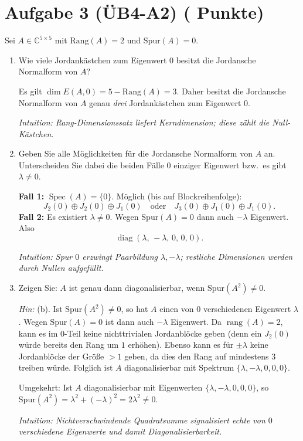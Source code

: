 \documentclass[11pt, a4paper]{article}
\newcommand{\aufgabe}[2]{%
  \section*{\Large\bfseries Aufgabe #1%
  \if\relax\detokenize{#2}\relax\else \hfill\normalfont\normalsize(#2 Punkte)\fi}%
  \vspace{-1.5ex}
}
\begin{document}
\aufgabe{3 (ÜB4-A2)}{}
Sei $A\in\mathbb{C}^{5\times 5}$ mit $\mathrm{Rang}(A)=2$ und $\mathrm{Spur}(A)=0$.
\begin{enumerate}
  \item Wie viele Jordankästchen zum Eigenwert $0$ besitzt die Jordansche Normalform von $A$?
  \begin{framed}
  Es gilt $\dim E(A,0)=5-\mathrm{Rang}(A)=3$. Daher besitzt die Jordansche
  Normalform von $A$ genau \emph{drei} Jordankästchen zum Eigenwert $0$.

  \medskip\noindent\textit{Intuition: Rang-Dimensionssatz liefert Kerndimension; diese zählt die Null-Kästchen.}
  \end{framed}

  \item Geben Sie alle Möglichkeiten für die Jordansche Normalform von $A$ an. Unterscheiden Sie dabei die beiden Fälle $0$ einziger Eigenwert bzw.\ es gibt $\lambda\neq 0$.
  \begin{framed}
  \textbf{Fall 1:} $\operatorname{Spec}(A)=\{0\}$.
  Möglich (bis auf Blockreihenfolge):
  \[
    J_2(0)\oplus J_2(0)\oplus J_1(0)
    \quad\text{oder}\quad
    J_3(0)\oplus J_1(0)\oplus J_1(0).
  \]
  \textbf{Fall 2:} Es existiert $\lambda\neq 0$. Wegen $\mathrm{Spur}(A)=0$
  dann auch $-\lambda$ Eigenwert. Also
  \[
    \operatorname{diag}(\lambda,\,-\lambda,\,0,\,0,\,0).
  \]

  \medskip\noindent\textit{Intuition: Spur $0$ erzwingt Paarbildung $\lambda,-\lambda$; restliche Dimensionen werden durch Nullen aufgefüllt.}
  \end{framed}

  \item Zeigen Sie: $A$ ist genau dann diagonalisierbar, wenn $\mathrm{Spur}(A^2)\neq 0$.
  \begin{framed}
\emph{Hin:} (b).  Ist $\mathrm{Spur}(A^2)\neq 0$, so hat $A$ einen von $0$ verschiedenen Eigenwert $\lambda$.
Wegen $\mathrm{Spur}(A)=0$ ist dann auch $-\lambda$ Eigenwert. 
Da $\operatorname{rang}(A)=2$, kann es im $0$-Teil keine nichttrivialen Jordanblöcke geben 
(denn ein $J_2(0)$ würde bereits den Rang um $1$ erhöhen). 
Ebenso kann es für $\pm\lambda$ keine Jordanblöcke der Größe $>1$ geben, 
da dies den Rang auf mindestens $3$ treiben würde. 
Folglich ist $A$ diagonalisierbar mit Spektrum $\{\lambda,-\lambda,0,0,0\}$.

Umgekehrt: Ist $A$ diagonalisierbar mit Eigenwerten $\{\lambda,-\lambda,0,0,0\}$, so
$\mathrm{Spur}(A^2)=\lambda^2+(-\lambda)^2=2\lambda^2\neq 0$.

\medskip\noindent\textit{Intuition: Nichtverschwindende Quadratsumme signalisiert echte von $0$ verschiedene Eigenwerte und damit Diagonalisierbarkeit.}
  \end{framed}
\end{enumerate}
\end{document}
